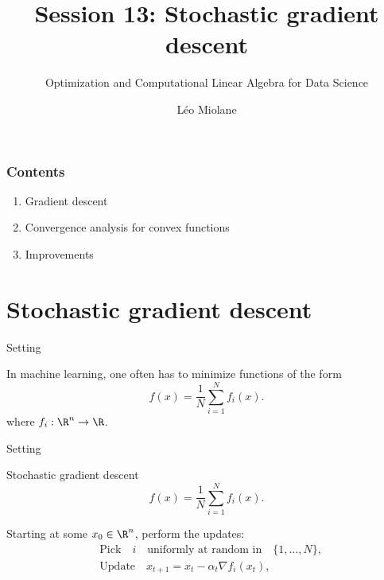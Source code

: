 \documentclass{beamer}
\title{Session 13: Stochastic gradient descent}
\subtitle{Optimization and Computational Linear Algebra for Data Science}
\author{Léo Miolane}
\date{}
\begin{document}
\setcounter{showProgressBar}{0}
\setcounter{showSlideNumbers}{0}

\frame{\titlepage}
\setcounter{framenumber}{0}
\setcounter{showSlideNumbers}{1}

\begin{frame}
	\frametitle{Contents}
	\begin{enumerate}
		\item Gradient descent
		\item Convergence analysis for convex functions
		\item Improvements
	\end{enumerate}
\end{frame}

\section{Stochastic gradient descent}

\begin{frame}[t]{Setting}
	\grid

	\vspace{-0.2cm}
	In machine learning, one often has to minimize functions of the form
	$$
	f(x) = \frac{1}{N} \sum_{i=1}^N f_i(x).
	$$
	where $f_i : \R^n \to \R$.

\end{frame}

\begin{frame}[t]{Setting}
	\grid


\end{frame}

\begin{frame}[t]{Stochastic gradient descent}
	\grid
	$$
	f(x) = \frac{1}{N} \sum_{i=1}^N f_i(x).
	$$

	\begin{exampleblock}{}
		Starting at some $x_0 \in \R^n$, perform the updates:
\begin{align*}
	&\text{Pick} \quad i \quad \text{uniformly at random in} \quad \{1, \dots, N\}, \\
	&\text{Update} \quad x_{t+1} = x_t - \alpha_t \nabla f_i(x_t),
\end{align*}
	\end{exampleblock}

\end{frame}
\end{document}

